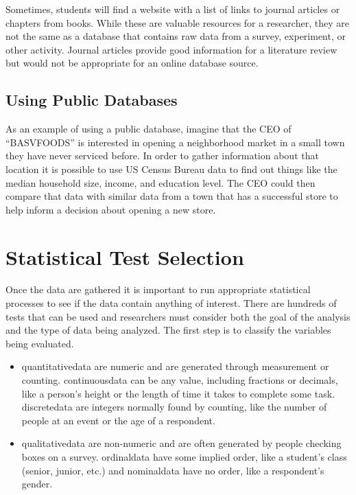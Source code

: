 Sometimes, students will find a website with a list of links to journal articles or chapters from books. While these are valuable resources for a researcher, they are not the same as a database that contains raw data from a survey, experiment, or other activity. Journal articles provide good information for a literature review but would not be appropriate for an online database source.

\subsection{Using Public Databases}

As an example of using a public database, imagine that the CEO of ``BASVFOODS'' is interested in opening a neighborhood market in a small town they have never serviced before. In order to gather information about that location it is possible to use US Census Bureau data to find out things like the median household size, income, and education level. The CEO could then compare that data with similar data from a town that has a successful store to help inform a decision about opening a new store.

\section{Statistical Test Selection}

Once the data are gathered it is important to run appropriate statistical processes to see if the data contain anything of interest. There are hundreds of tests that can be used and researchers must consider both the goal of the analysis and the type of data being analyzed. The first step is to classify the variables being evaluated. 

\begin{itemize}
	\item \Gls{quantitativedata} are numeric and are generated through measurement or counting. \gls{continuousdata} can be any value, including fractions or decimals, like a person's height or the length of time it takes to complete some task. \Gls{discretedata} are integers normally found by counting, like the number of people at an event or the age of a respondent.

	\item \Gls{qualitativedata} are non-numeric and are often generated by people checking boxes on a survey. \Gls{ordinaldata} have some implied order, like a student's class (senior, junior, etc.) and \gls{nominaldata} have no order, like a respondent's gender.
\end{itemize}

